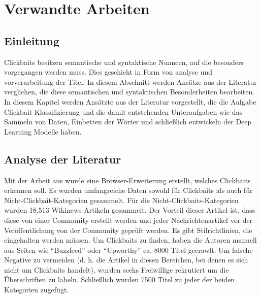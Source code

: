 
\chapter{Verwandte Arbeiten}%


\section{Einleitung}
Clickbaits besitzen semantische und syntaktische Nuancen, auf die besonders vorgegangen werden muss. Dies geschieht in Form von analyse und vorverarbeitung der Titel. In diesem Abschnitt werden Ansätze aus der Literatur verglichen, die diese semantischen und syntaktischen Besonderheiten bearbeiten. In diesem Kapitel werden Ansätzte aus der Literatur vorgestellt, die die Aufgabe Clickbait Klassifizierung und die damit entstehenden Unteraufgaben wie das Sammeln von Daten, Einbetten der Wörter und schließlich entwickeln der Deep Learning Modelle haben.


\section{Analyse der Literatur}
Mit der Arbeit aus \cite*{Chakrabortya} wurde eine Browser-Erweiterung erstellt, welches Clickbaits erkennen soll. Es wurden umfangreiche Daten sowohl für Clickbaits als auch für Nicht-Clickbait-Kategorien gesammelt. Für die Nicht-Clickbaits-Kategorien wurden 18.513 Wikinews Artikeln gesammelt. Der Vorteil dieser Artikel ist, dass diese von einer Community erstellt werden und jeder Nachrichtenartikel vor der Veröffentlichung von der Community geprüft werden. Es gibt Stilrichtlinien, die eingehalten werden müssen. Um Clickbaits zu finden, haben die Autoren manuell aus Seiten wie \enquote{Buzzfeed} oder \enquote{Upworthy} ca. 8000 Titel gecrawlt. Um falsche Negative zu vermeiden (d. h. die Artikel in diesen Bereichen, bei denen es sich nicht um Clickbaits handelt), wurden sechs Freiwillige rekrutiert um die Überschriften zu labeln. Schließlich wurden 7500 Titel zu jeder der beiden Kategorien zugefügt.



